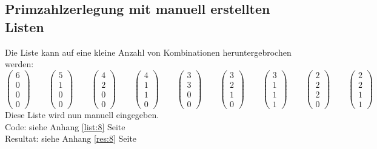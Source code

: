 \documentclass[a4paper, 10pt, fleqn]{article}
\begin{document}
\subsection{Primzahlzerlegung mit manuell erstellten Listen}
\label{sec:8}
Die Liste kann auf eine kleine Anzahl von Kombinationen heruntergebrochen 
werden: 
\[ \begin{pmatrix}6\\0\\0\\0\end{pmatrix} \qquad 
   \begin{pmatrix}5\\1\\0\\0\end{pmatrix} \qquad 
   \begin{pmatrix}4\\2\\0\\0\end{pmatrix} \qquad 
   \begin{pmatrix}4\\1\\1\\0\end{pmatrix} \qquad 
   \begin{pmatrix}3\\3\\0\\0\end{pmatrix} \qquad 
   \begin{pmatrix}3\\2\\1\\0\end{pmatrix} \qquad 
   \begin{pmatrix}3\\1\\1\\1\end{pmatrix} \qquad 
   \begin{pmatrix}2\\2\\2\\0\end{pmatrix} \qquad 
   \begin{pmatrix}2\\2\\1\\1\end{pmatrix} \qquad \]
Diese Liste wird nun manuell eingegeben. \\
Code: siehe Anhang \ref{list:8} Seite \pageref{list:8} \\
Resultat: siehe Anhang \ref{res:8} Seite \pageref{res:8} 
% 
\end{document}
